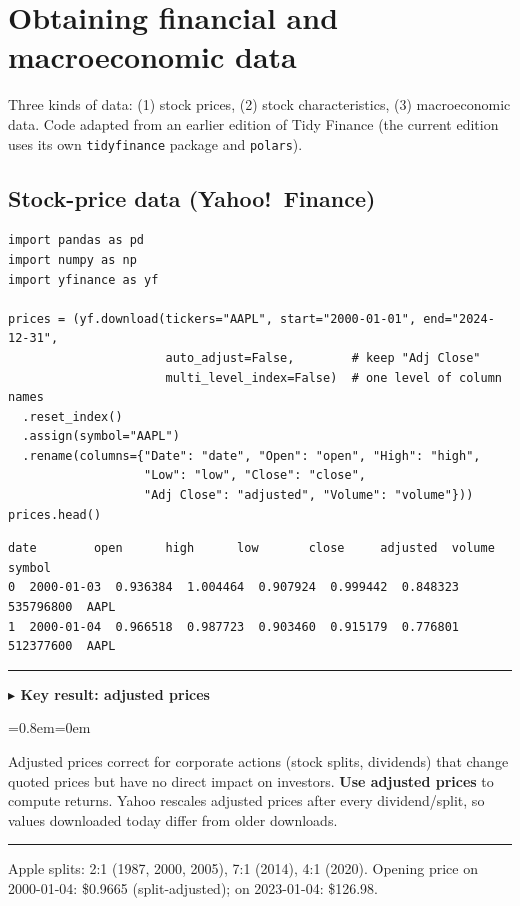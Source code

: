 \documentclass[11pt,a4paper]{report}
\newenvironment{notebox}[1]
  {\par\medskip\Needspace{6\baselineskip}\noindent\rule{\linewidth}{0.4pt}\par\nopagebreak
   \noindent\textbf{#1}\par\nopagebreak
   \begin{list}{}{\leftmargin=0.8em\rightmargin=0em\topsep=2pt}\item[]}
  {\end{list}\nopagebreak\noindent\rule{\linewidth}{0.4pt}\par\medskip}
\newenvironment{keybox}[1][]{\begin{notebox}{$\blacktriangleright$ Key result#1}}{\end{notebox}}
\begin{document}
\section{Obtaining financial and macroeconomic data}
Three kinds of data: (1) stock prices, (2) stock characteristics,
(3) macroeconomic data. Code adapted from an earlier edition of Tidy Finance
(the current edition uses its own \texttt{tidyfinance} package and
\texttt{polars}).

\subsection{Stock-price data (Yahoo!\ Finance)}
\begin{lstlisting}
import pandas as pd
import numpy as np
import yfinance as yf

prices = (yf.download(tickers="AAPL", start="2000-01-01", end="2024-12-31",
                      auto_adjust=False,        # keep "Adj Close"
                      multi_level_index=False)  # one level of column names
  .reset_index()
  .assign(symbol="AAPL")
  .rename(columns={"Date": "date", "Open": "open", "High": "high",
                   "Low": "low", "Close": "close",
                   "Adj Close": "adjusted", "Volume": "volume"}))
prices.head()
\end{lstlisting}
\begin{lstlisting}[style=out]
   date        open      high      low       close     adjusted  volume     symbol
0  2000-01-03  0.936384  1.004464  0.907924  0.999442  0.848323  535796800  AAPL
1  2000-01-04  0.966518  0.987723  0.903460  0.915179  0.776801  512377600  AAPL
\end{lstlisting}

\begin{keybox}[: adjusted prices]
Adjusted prices correct for corporate actions (stock splits, dividends) that
change quoted prices but have no direct impact on investors. \textbf{Use
adjusted prices} to compute returns. Yahoo rescales adjusted prices after every
dividend/split, so values downloaded today differ from older downloads.
\end{keybox}
Apple splits: 2:1 (1987, 2000, 2005), 7:1 (2014), 4:1 (2020). Opening price
on 2000-01-04: \$0.9665 (split-adjusted); on 2023-01-04: \$126.98.
\end{document}
